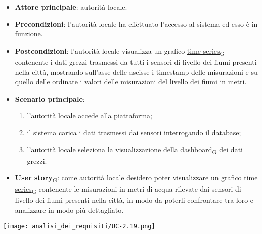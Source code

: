 \newpage
{}
\begin{itemize}
	\item \textbf{Attore principale}: autorità locale.
	\item \textbf{Precondizioni}: l'autorità locale ha effettuato l'accesso al sistema ed esso è in funzione.
	\item \textbf{Postcondizioni}: l'autorità locale visualizza un grafico \href{https://7last.github.io/docs/pb/documentazione-interna/glossario\#time-series}{time series\textsubscript{G}} contenente i dati grezzi trasmessi da tutti i sensori di livello dei fiumi presenti nella città, mostrando sull'asse delle ascisse i timestamp delle misurazioni e su quello delle ordinate i valori delle misurazioni del livello dei fiumi in metri.
	\item \textbf{Scenario principale}:
	      \begin{enumerate}
		      \item l'autorità locale accede alla piattaforma;
		      \item il sistema carica i dati trasmessi dai sensori interrogando il database;
		      \item l'autorità locale seleziona la visualizzazione della \href{https://7last.github.io/docs/pb/documentazione-interna/glossario\#dashboard}{dashboard\textsubscript{G}} dei dati grezzi.
	      \end{enumerate}
	\item \href{https://7last.github.io/docs/pb/documentazione-interna/glossario\#user-story}{\textbf{User story}\textsubscript{G}}:
	      come autorità locale desidero poter visualizzare un grafico \href{https://7last.github.io/docs/pb/documentazione-interna/glossario\#time-series}{time series\textsubscript{G}} contenente le misurazioni in metri di acqua rilevate dai sensori
	      di livello dei fiumi presenti nella città, in modo da poterli confrontare tra loro e analizzare in modo più dettagliato.
\end{itemize}
\begin{center}
	\texttt{[image: analisi\_dei\_requisiti/UC-2.19.png]}
\end{center}


